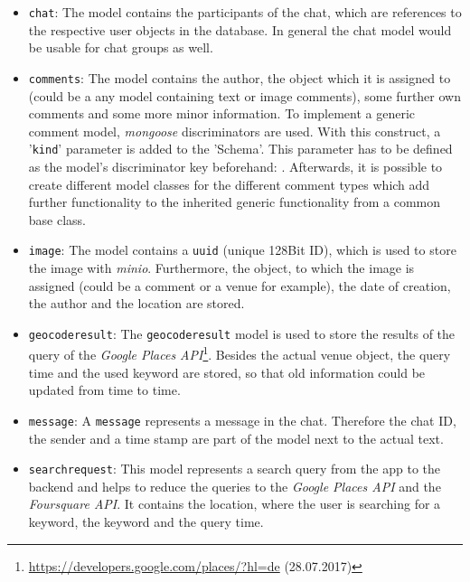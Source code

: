 \begin{itemize}
	\item \texttt{chat}: The model contains the participants of the chat, which are references to the respective user objects in the database. In general the chat model would be usable for chat groups as well.
	\item \texttt{comments}: The model contains the author, the object which it is assigned to (could be a any model containing text or image comments), some further own comments and some more minor information.  To implement a generic comment model, \textit{mongoose} discriminators are used. With this construct, a '\texttt{kind}' parameter is added to the 'Schema'. This parameter has to be defined as the model's discriminator key beforehand: %
	. Afterwards, it is possible to create different model classes for the different comment types which add further functionality to the inherited generic functionality from a common base class.
	\item \texttt{image}: The model contains a \texttt{uuid} (unique 128Bit ID), which is used to store the image with \textit{minio}. Furthermore, the object, to which the image is assigned (could be a comment or a venue for example), the date of creation, the author and the location are stored.
	\item \texttt{geocoderesult}: The \texttt{geocoderesult} model is used to store the results of the query of the \textit{Google Places API}\footnote{\url{https://developers.google.com/places/?hl=de} (28.07.2017)}. Besides the actual venue object, the query time and the used keyword are stored, so that old information could be updated from time to time.
	\item \texttt{message}: A \texttt{message} represents a message in the chat. Therefore the chat ID, the sender and a time stamp are part of the model next to the actual text. 
	\item \texttt{searchrequest}: This model represents a search query from the app to the backend and helps to reduce the queries to the \textit{Google Places API} and the \textit{Foursquare API}. It contains the location, where the user is searching for a keyword, the keyword and the query time.

\end{itemize}
